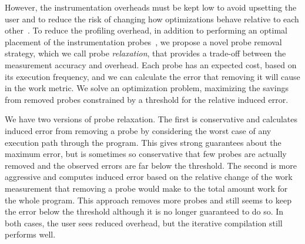     However, the instrumentation overheads must be kept low to avoid upsetting the user and to reduce the risk
    of changing how optimizations behave relative to each other~\cite{forman81,anderson97,duesterwald00}.
    To reduce the profiling overhead, in addition to performing an optimal placement of the instrumentation probes~\cite{knuth73,forman81,ball94},
    we propose a novel probe removal strategy, which we call probe \textit{relaxation}, that provides a trade-off between the measurement accuracy and overhead.
    Each probe has an expected cost, based on its execution frequency, and we can calculate the error that removing it will cause in the work metric.
    We solve an optimization problem, maximizing the savings from removed probes constrained by a threshold for the relative induced error.

    We have two versions of probe relaxation. The first is conservative and calculates induced error from removing a probe by considering
    the worst case of any execution path through the program. This gives strong guarantees about the maximum error, but is sometimes so
    conservative that few probes are actually removed and the observed errors are far below the threshold. The second is more aggressive and
    computes induced error based on the relative change of the work measurement that removing a probe would make to the total amount work for the whole program.
    This approach removes more probes and still seems to keep the error below the threshold although it is no longer guaranteed to do so. In
    both cases, the user sees reduced overhead, but the iterative compilation still performs well.

